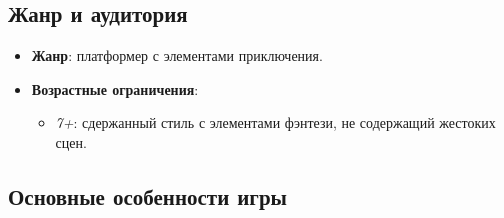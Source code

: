 \documentclass{article}
\begin{document}
\subsection{Жанр и аудитория}

\begin{itemize}
    \item \textbf{Жанр}: платформер с элементами приключения.
    \item \textbf{Возрастные ограничения}:
    \begin{itemize}
        \item \textit{7+}: сдержанный стиль с элементами фэнтези, не содержащий жестоких сцен.
    \end{itemize}
\end{itemize}

\subsection{Основные особенности игры}
\end{document}
